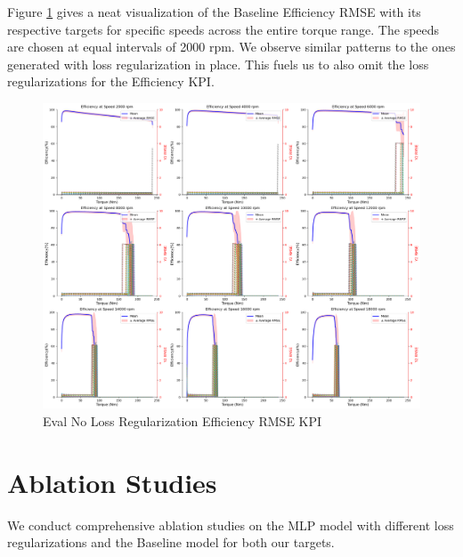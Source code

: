 \documentclass{report} %
\begin{document}
Figure \ref{fig:Eval No Loss Regularization Efficiency RMSE KPI} gives a neat visualization of the Baseline Efficiency \ac{RMSE} with its respective targets 
for specific speeds across the entire torque range. The speeds are chosen at equal intervals of 2000 rpm.
We observe similar patterns to the ones generated with loss regularization in place. This fuels us to also omit the loss regularizations for the Efficiency \ac{KPI}.
\begin{figure}[H]
    \centering
    \includegraphics[width=1\textwidth]{./ReportImages/rmse_eta_no_lossreg_MLP.png} 
    \caption{Eval No Loss Regularization Efficiency \ac{RMSE} \ac{KPI}} 
    \label{fig:Eval No Loss Regularization Efficiency RMSE KPI}
\end{figure}

\section{Ablation Studies}\label{sec:Ablation Studies}

We conduct comprehensive ablation studies on the \ac{MLP} model with different loss regularizations and the Baseline model for both our targets.
\end{document}
